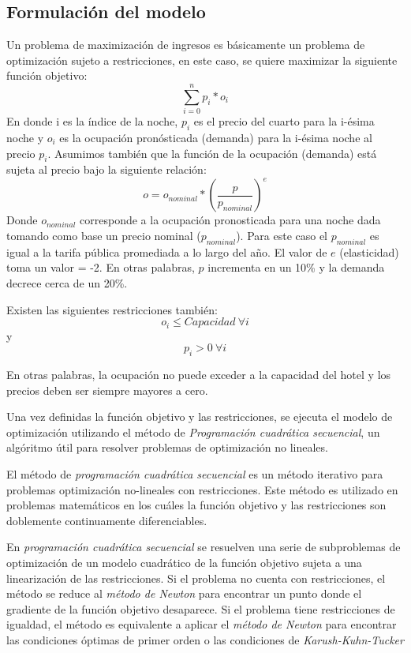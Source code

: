 \subsection*{Formulación del modelo}

Un problema de maximización de ingresos es básicamente un problema de optimización sujeto a restricciones, en este caso, se quiere maximizar la siguiente función objetivo:
$$\sum_{i=0}^{n}p_i*o_i$$
En donde i es la índice de la noche, $p_i$ es el precio del cuarto para la i-ésima noche y $o_i$ es la ocupación pronósticada (demanda) para la i-ésima noche al precio $p_i$. Asumimos también que la función de la ocupación (demanda) está sujeta al precio bajo la siguiente relación:
$$o = o_{nominal} * (\frac{p}{p_{nominal}})^e$$
Donde $o_{nominal}$ corresponde a la ocupación pronosticada para una noche dada tomando como base un precio nominal ($p_{nominal}$). Para este caso el $p_{nominal}$ es igual a la tarifa pública promediada a lo largo del año. El valor de $e$ (elasticidad) toma un valor = -2. En otras palabras, $p$ incrementa en un 10\% y la demanda decrece cerca de un 20\%.

Existen las siguientes restricciones también: $$o_i \leq Capacidad\ \forall i$$ y $$p_i > 0\ \forall i$$

En otras palabras, la ocupación no puede exceder a la capacidad del hotel y los precios deben ser siempre mayores a cero.

Una vez definidas la función objetivo y las restricciones, se ejecuta el modelo de optimización utilizando el método de \emph{Programación cuadrática secuencial}, un algóritmo útil para resolver problemas de optimización no lineales.

El método de \emph{programación cuadrática secuencial} es un método iterativo para problemas optimización no-lineales con restricciones. Este método es utilizado en problemas matemáticos en los cuáles la función objetivo y las restricciones son doblemente continuamente diferenciables.

En \emph{programación cuadrática secuencial} se resuelven una serie de subproblemas de optimización de un modelo cuadrático de la función objetivo sujeta a una linearización de las restricciones. Si el problema no cuenta con restricciones, el método se reduce al \emph{método de Newton} para encontrar un punto donde el gradiente de la función objetivo desaparece. Si el problema tiene restricciones de igualdad, el método es equivalente a aplicar el \emph{método de Newton} para encontrar las condiciones óptimas de primer orden o las condiciones de \emph{Karush-Kuhn-Tucker}


